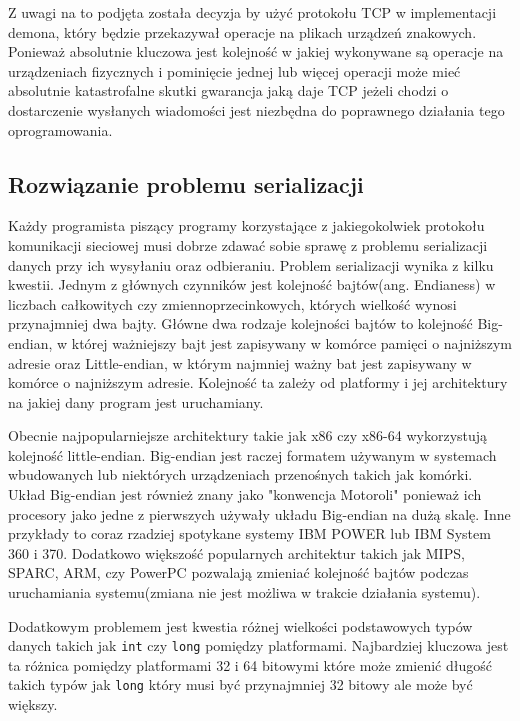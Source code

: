 \documentclass[10pt]{article}
\begin{document}
Z uwagi na to podjęta została decyzja by użyć protokołu TCP w implementacji demona, który będzie przekazywał operacje na plikach urządzeń znakowych. Ponieważ absolutnie kluczowa jest kolejność w jakiej wykonywane są operacje na urządzeniach fizycznych i pominięcie jednej lub więcej operacji może mieć absolutnie katastrofalne skutki gwarancja jaką daje TCP jeżeli chodzi o dostarczenie wysłanych wiadomości jest niezbędna do poprawnego działania tego oprogramowania.

\subsection{Rozwiązanie problemu serializacji}

Każdy programista piszący programy korzystające z jakiegokolwiek protokołu komunikacji sieciowej musi dobrze zdawać sobie sprawę z problemu serializacji danych przy ich wysyłaniu oraz odbieraniu. Problem serializacji wynika z kilku kwestii. Jednym z głównych czynników jest kolejność bajtów(ang. Endianess) w liczbach całkowitych czy zmiennoprzecinkowych, których wielkość wynosi przynajmniej dwa bajty. Główne dwa rodzaje kolejności bajtów to kolejność Big-endian, w której ważniejszy bajt jest zapisywany w komórce pamięci o najniższym adresie oraz Little-endian, w którym najmniej ważny bat jest zapisywany w komórce o najniższym adresie. Kolejność ta zależy od platformy i jej architektury na jakiej dany program jest uruchamiany.

Obecnie najpopularniejsze architektury takie jak x86 czy x86-64 wykorzystują kolejność little-endian. Big-endian jest raczej formatem używanym w systemach wbudowanych lub niektórych urządzeniach przenośnych takich jak komórki. Układ Big-endian jest również znany jako "konwencja Motoroli" ponieważ ich procesory jako jedne z pierwszych używały układu Big-endian na dużą skalę. Inne przykłady to coraz rzadziej spotykane systemy IBM POWER lub IBM System 360 i 370. Dodatkowo większość popularnych architektur takich jak MIPS, SPARC, ARM, czy PowerPC pozwalają zmieniać kolejność bajtów podczas uruchamiania systemu(zmiana nie jest możliwa w trakcie działania systemu).

Dodatkowym problemem jest kwestia różnej wielkości podstawowych typów danych takich jak \texttt{int} czy \texttt{long} pomiędzy platformami. Najbardziej kluczowa jest ta różnica pomiędzy platformami 32 i 64 bitowymi które może zmienić długość takich typów jak \texttt{long} który musi być przynajmniej 32 bitowy ale może być większy.
\end{document}
